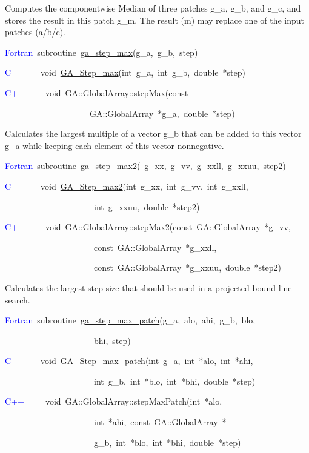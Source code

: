 Computes the componentwise Median of three patches g\_a, g\_b, and
g\_c, and stores the result in this patch g\_m. The result (m) may
replace one of the input patches (a/b/c). 
\begin{lyxcode}
\textcolor{blue}{Fortran}~subroutine~\href{http://www.emsl.pnl.gov/docs/global/ga_ops.html\#ga_step_max}{ga\_{}step\_{}max}(g\_a,~g\_b,~step)~

\textcolor{blue}{C}~~~~~~~void~\href{http://www.emsl.pnl.gov/docs/global/c_nga_ops.html\#ga_step_max}{GA\_{}Step\_{}max}(int~g\_a,~int~g\_b,~double~{*}step)~

\textcolor{blue}{C++~}~~~~void~GA::GlobalArray::stepMax(const~

~~~~~~~~~~~~~~~~~~~~GA::GlobalArray~{*}g\_a,~double~{*}step)
\end{lyxcode}
Calculates the largest multiple of a vector g\_b that can be added
to this vector g\_a while keeping each element of this vector nonnegative. 
\begin{lyxcode}
\textcolor{blue}{Fortran}~subroutine~\href{http://www.emsl.pnl.gov/docs/global/ga_ops.html\#ga_step_max2}{ga\_{}step\_{}max2}(~g\_xx,~g\_vv,~g\_xxll,~g\_xxuu,~step2)~

\textcolor{blue}{C}~~~~~~~void~\href{http://www.emsl.pnl.gov/docs/global/c_nga_ops.html\#ga_step_max2}{GA\_{}Step\_{}max2}(int~g\_xx,~int~g\_vv,~int~g\_xxll,

~~~~~~~~~~~~~~~~~~~~~int~g\_xxuu,~double~{*}step2)

\textcolor{blue}{C++}~~~~~void~GA::GlobalArray::stepMax2(const~GA::GlobalArray~{*}g\_vv,~

~~~~~~~~~~~~~~~~~~~~~const~GA::GlobalArray~{*}g\_xxll,~

~~~~~~~~~~~~~~~~~~~~~const~GA::GlobalArray~{*}g\_xxuu,~double~{*}step2)
\end{lyxcode}
Calculates the largest step size that should be used in a projected
bound line search. 
\begin{lyxcode}
\textcolor{blue}{Fortran}~subroutine~\href{http://www.emsl.pnl.gov/docs/global/ga_ops.html\#ga_step_max_patch}{ga\_{}step\_{}max\_{}patch}(g\_a,~alo,~ahi,~g\_b,~blo,

~~~~~~~~~~~~~~~~~~~~~bhi,~step)~

\textcolor{blue}{C}~~~~~~~void~\href{http://www.emsl.pnl.gov/docs/global/c_nga_ops.html\#ga_step_max_patch}{GA\_{}Step\_{}max\_{}patch}(int~g\_a,~int~{*}alo,~int~{*}ahi,~

~~~~~~~~~~~~~~~~~~~~~int~g\_b,~int~{*}blo,~int~{*}bhi,~double~{*}step)

\textcolor{blue}{C++}~~~~~void~GA::GlobalArray::stepMaxPatch(int~{*}alo,~

~~~~~~~~~~~~~~~~~~~~~int~{*}ahi,~const~GA::GlobalArray~{*}~

~~~~~~~~~~~~~~~~~~~~~g\_b,~int~{*}blo,~int~{*}bhi,~double~{*}step)
\end{lyxcode}
